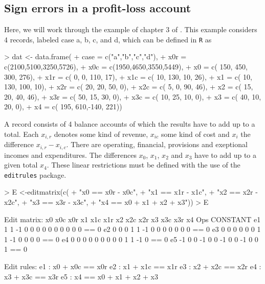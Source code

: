 \documentclass[11pt, fleqn, a4paper]{article}
\begin{document}
\subsection{Sign errors in a profit-loss account}
\label{exScholtusCorrectSigns}
Here, we will work through the example of chapter $3$ of \citet{scholtus:2008}.
This example considers 4 records, labeled case a, b, c, and d, which can be
defined in {\tt R} as
\begin{Schunk}
\begin{Sinput}
> dat <- data.frame(
+    case = c("a","b","c","d"),
+    x0r = c(2100,5100,3250,5726),
+    x0c = c(1950,4650,3550,5449),
+    x0  = c( 150, 450, 300, 276),
+    x1r = c(   0,   0, 110,  17),
+    x1c = c(  10, 130,  10,  26),
+    x1  = c(  10, 130, 100,  10),
+    x2r = c(  20,  20,  50,   0),
+    x2c = c(   5,   0,  90,  46),
+    x2  = c(  15,  20,  40,  46),
+    x3r = c(  50,  15,  30,   0),
+    x3c = c(  10,  25,  10,   0),
+    x3  = c(  40,  10,  20,   0),
+    x4  = c( 195, 610,-140, 221))
\end{Sinput}
\end{Schunk}
A record consists of 4 balance accounts of which the results have to add up to
a total.  Each $x_{i,r}$ denotes some kind of revenue, $x_{ic}$ some kind of
cost and $x_i$ the difference $x_{i,r}-x_{i,c}$. There are operating,
financial, provisions and exeptional incomes and expenditures. The differences
$x_0$, $x_1$, $x_2$ and $x_3$ have to add up to a given total $x_4$.  These
linear restrictions must be defined with the use of the {\tt editrules} package.
\begin{Schunk}
\begin{Sinput}
> E <-editmatrix(c(
+     "x0 == x0r - x0c",
+     "x1 == x1r - x1c",
+     "x2 == x2r - x2c",
+     "x3 == x3r - x3c",
+     "x4 == x0 + x1 + x2 + x3"))
> E
\end{Sinput}
\begin{Soutput}
Edit matrix:
   x0 x0c x0r x1 x1c x1r x2 x2c x2r x3 x3c x3r x4 Ops CONSTANT
e1  1   1  -1  0   0   0  0   0   0  0   0   0  0  ==        0
e2  0   0   0  1   1  -1  0   0   0  0   0   0  0  ==        0
e3  0   0   0  0   0   0  1   1  -1  0   0   0  0  ==        0
e4  0   0   0  0   0   0  0   0   0  1   1  -1  0  ==        0
e5 -1   0   0 -1   0   0 -1   0   0 -1   0   0  1  ==        0

Edit rules:
e1 : x0 + x0c == x0r 
e2 : x1 + x1c == x1r 
e3 : x2 + x2c == x2r 
e4 : x3 + x3c == x3r 
e5 : x4 == x0 + x1 + x2 + x3  
\end{Soutput}
\end{Schunk}
\end{document}
